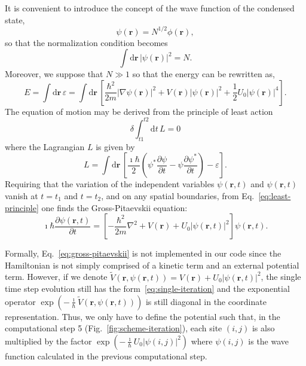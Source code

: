 It is convenient to introduce the concept of the wave function of the condensed state,
\begin{equation}
\psi(\textbf{r}) = N^{1/2} \phi(\textbf{r}),
\end{equation}
so that the normalization condition becomes
\begin{equation} \label{eq:normalization-N}
\int \mathrm{d}\textbf{r} \, |\psi(\textbf{r})|^2 = N.
\end{equation}
Moreover, we suppose that $N \gg 1$ so that the energy can be rewritten as,
\begin{equation}
E = \int \mathrm{d} \textbf{r} \, \varepsilon  = \int \mathrm{d} \textbf{r} \, \left[ \frac{\hbar^2}{2m} |\nabla \psi(\textbf{r}) |^2 + V(\textbf{r}) |\psi(\textbf{r})|^2 + \frac{1}{2} U_0 |\psi(\textbf{r})|^4 \right].
\end{equation}
The equation of motion may be derived from the principle of least action 
\begin{equation}
\delta \int_{t1}^{t2} \mathrm{d} t \, L = 0 \label{eq:least-principle}
\end{equation}
where the Lagrangian $L$ is given by
\begin{equation}
L = \int \mathrm{d} \textbf{r} \, \left[ \frac{\imath \hbar}{2} \left( \psi^\ast \frac{\partial \psi}{\partial t} - \psi \frac{\partial \psi^\ast}{\partial t} \right) - \varepsilon \right].
\end{equation}
Requiring that the variation of the independent variables $\psi(\textbf{r},t)$ and $\psi(\textbf{r},t)$ vanish at $t=t_1$ and $t=t_2$, and on any spatial boundaries, from Eq.~\eqref{eq:least-principle} one finds the Gross-Pitaevskii equation:
\begin{equation} \label{eq:gross-pitaevskii}
\imath \hbar \frac{\partial \psi(\textbf{r}, t)}{\partial t} = \left[ - \frac{\hbar^2}{2m} \nabla^2 + V(\textbf{r}) + U_0 |\psi(\textbf{r}, t)|^2 \right] \psi(\textbf{r}, t).
\end{equation}

Formally, Eq.~\eqref{eq:gross-pitaevskii} is not implemented in our code since the Hamiltonian is not simply comprised of a kinetic term and an external potential term. However, if we denote $\tilde{V}(\textbf{r}, \psi(\textbf{r}, t)) = V(\textbf{r}) + U_0 |\psi(\textbf{r}, t)|^2$, the single time step evolution still has the form~\eqref{eq:single-iteration} and the exponential operator $\exp \left( - \frac{\imath}{\hbar} \tilde{V}(\textbf{r}, \psi(\textbf{r}, t)) \right)$ is still diagonal in the coordinate representation. Thus, we only have to define the potential such that, in the computational step 5 (Fig.~\ref{fig:scheme-iteration}), each site $(i,j)$ is also multiplied by the factor $\exp(-\frac{\imath}{\hbar} U_0 |\psi(i,j)|^2)$ where $\psi(i,j)$ is the wave function calculated in the previous computational step.

